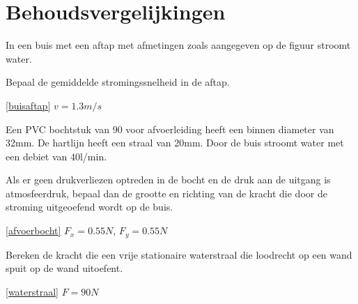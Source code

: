 \chapter{Behoudsvergelijkingen}
\label{sec:Behoudsvergelijkingen}
	\begin{toepassing}
		\label{buisaftap}
In een buis met een aftap met afmetingen zoals aangegeven op de figuur stroomt water.
		
Bepaal de gemiddelde stromingssnelheid in de aftap.
		\begin{center}
			
		\end{center}
	\end{toepassing}
	\begin{antwoord}{\ref{buisaftap}}
		$v = \unit{1.3}{m/s}$
	\end{antwoord}
	\begin{toepassing}
		\label{afvoerbocht}
Een PVC bochtstuk van \unit{90}{\degree} voor afvoerleiding heeft een binnen diameter van \unit{32}{mm}. De hartlijn heeft een straal van \unit{20}{mm}. Door de buis stroomt water met een debiet van \unit{40}{l/min}.
		
Als er geen drukverliezen optreden in de bocht en de druk aan de uitgang is atmosfeerdruk, bepaal dan de grootte en richting van de kracht die door de stroming uitgeoefend wordt op de buis.
		\begin{center}
			
		\end{center}
	\end{toepassing}
	\begin{antwoord}{\ref{afvoerbocht}}
		$F_x = \unit{0.55}{N}$, $F_y = \unit{0.55}{N}$
	\end{antwoord}
	\begin{toepassing}[*]
		\label{waterstraal}
Bereken de kracht die een vrije stationaire waterstraal die loodrecht op een wand spuit op de wand uitoefent.
		\begin{center}
			
		\end{center}
	\end{toepassing}
	\begin{antwoord}{\ref{waterstraal}}
		$F = \unit{90}{N}$
	\end{antwoord}
